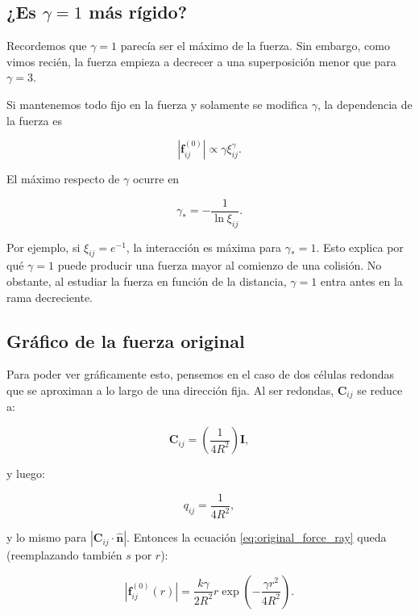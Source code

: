 \documentclass[11pt,a4paper]{article}
\begin{document}
\subsection{¿Es $\gamma=1$ más rígido?}

Recordemos que $\gamma=1$ parecía ser el máximo de la fuerza. Sin embargo, como vimos recién, la fuerza empieza a decrecer a una superposición menor que para $\gamma=3$.

Si mantenemos todo fijo en la fuerza y solamente se modifica $\gamma$, la dependencia de la fuerza es

\begin{equation}
\left|\mathbf f_{ij}^{(0)}\right|
\propto
\gamma\xi_{ij}^{\gamma}.
\end{equation}

El máximo respecto de $\gamma$ ocurre en

\begin{equation}
\gamma_*
=
-\frac{1}{\ln\xi_{ij}}.
\end{equation}

Por ejemplo, si $\xi_{ij}=e^{-1}$, la interacción es máxima para $\gamma_*=1$. Esto explica por qué $\gamma=1$ puede producir una fuerza mayor al comienzo de una colisión. No obstante, al estudiar la fuerza en función de la distancia, $\gamma=1$ entra antes en la rama decreciente. 

\subsection{Gráfico de la fuerza original}

Para poder ver gráficamente esto, pensemos en el caso de dos células redondas que se aproximan a lo largo de una dirección fija. Al ser redondas, $\mathbf{C}_{ij}$ se reduce a:

\begin{equation}
	\mathbf C_{ij}= \left(\frac{1}{4R^{2}}\right)\mathbf{I},
\end{equation}

y luego:

\begin{equation}
	q_{ij}= \frac{1}{4R^{2}},
\end{equation}

y lo mismo para $\left|\mathbf C_{ij}\cdot\hat{\mathbf n}\right|$. Entonces la ecuación \ref{eq:original_force_ray} queda (reemplazando también $s$ por $r$):

\begin{equation}
	\left|\mathbf f_{ij}^{(0)}(r)\right|
	=\frac{k\gamma}{2R^{2}}
	r\exp\left(-\frac{\gamma r^2}{4R^{2}}\right).
\end{equation}
\end{document}
